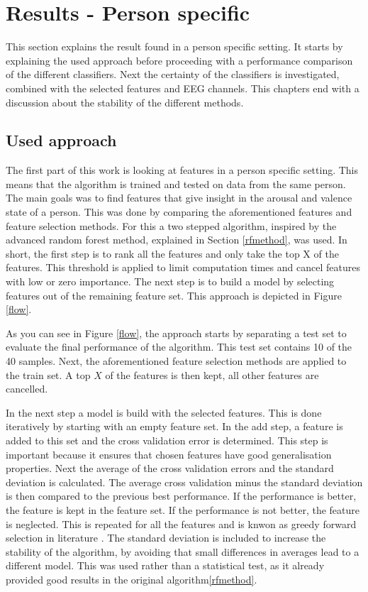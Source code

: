 \chapter{Results - Person specific}
{\samenvatting This section explains the result found in a person specific setting. It starts by explaining the used approach before proceeding with a performance comparison of the different classifiers. Next the certainty of the classifiers is investigated, combined with the selected features and EEG channels. This chapters end with a discussion about the stability of the different methods.}

\section{Used approach}
\label{approach}

The first part of this work is looking at features in a person specific setting. This means that the algorithm is trained and tested on data from the same person. The main goals was to find features that give insight in the arousal and valence state of a person. This was done by comparing the aforementioned features and feature selection methods. For this a two stepped algorithm, inspired by the advanced random forest method, explained in Section \ref{rfmethod}, was used. In short, the first step is to rank all the features and only take the top X of the features. This threshold is applied to limit computation times and cancel features with low or zero importance. The next step is to build a model by selecting features out of the remaining feature set. This approach is depicted in Figure \ref{flow}.


As you can see in Figure \ref{flow}, the approach starts by separating a test set to evaluate the final performance of the algorithm. This test set contains 10 of the 40 samples. Next, the aforementioned feature selection methods are applied to the train set. A top $X$ of the features is then kept, all other features are cancelled.

\npar

In the next step a model is build with the selected features. This is done iteratively by starting with an empty feature set. In the add step, a feature is added to this set and the cross validation error is determined. This step is important because it ensures that chosen features have good generalisation properties. Next the average of the cross validation errors and the standard deviation is calculated. The average cross validation minus the standard deviation is then compared to the previous best performance. If the performance is better, the feature is kept in the feature set. If the performance is not better, the feature is neglected. This is repeated for all the features and is knwon as greedy forward selection in literature \citep{greedyFS}. The standard deviation is included to increase the stability of the algorithm, by avoiding that small differences in averages lead to a different model. This was used rather than a statistical test, as it already provided good results in the original algorithm\ref{rfmethod}.


